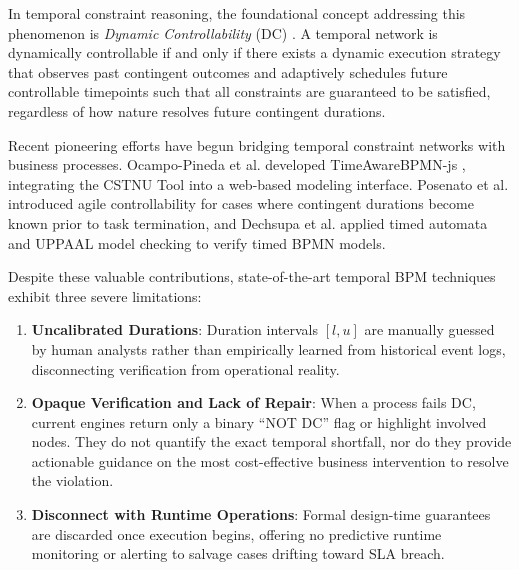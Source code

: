 \documentclass[conference]{IEEEtran}
\begin{document}
In temporal constraint reasoning, the foundational concept addressing this phenomenon is \textit{Dynamic Controllability} (DC) \cite{vidal1999, morris2005}. A temporal network is dynamically controllable if and only if there exists a dynamic execution strategy that observes past contingent outcomes and adaptively schedules future controllable timepoints such that all constraints are guaranteed to be satisfied, regardless of how nature resolves future contingent durations. 

Recent pioneering efforts have begun bridging temporal constraint networks with business processes. Ocampo-Pineda et al. developed TimeAwareBPMN-js \cite{ocampo2022}, integrating the CSTNU Tool into a web-based modeling interface. Posenato et al. introduced agile controllability \cite{posenato2024} for cases where contingent durations become known prior to task termination, and Dechsupa et al. \cite{dechsupa2025} applied timed automata and UPPAAL model checking to verify timed BPMN models. 

Despite these valuable contributions, state-of-the-art temporal BPM techniques exhibit three severe limitations:
\begin{enumerate}
    \item \textbf{Uncalibrated Durations}: Duration intervals $[l, u]$ are manually guessed by human analysts rather than empirically learned from historical event logs, disconnecting verification from operational reality.
    \item \textbf{Opaque Verification and Lack of Repair}: When a process fails DC, current engines return only a binary ``NOT DC'' flag or highlight involved nodes. They do not quantify the exact temporal shortfall, nor do they provide actionable guidance on the most cost-effective business intervention to resolve the violation.
    \item \textbf{Disconnect with Runtime Operations}: Formal design-time guarantees are discarded once execution begins, offering no predictive runtime monitoring or alerting to salvage cases drifting toward SLA breach.
\end{enumerate}
\end{document}
